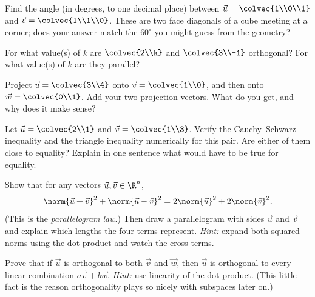 \begin{exercise}
Find the angle (in degrees, to one decimal place) between
$\vec u=\colvec{1\\0\\1}$ and $\vec v=\colvec{1\\1\\0}$. These are two face diagonals
of a cube meeting at a corner; does your answer match the $60^\circ$ you might guess
from the geometry?
\end{exercise}

\begin{exercise}
For what value(s) of $k$ are $\colvec{2\\k}$ and $\colvec{3\\-1}$ orthogonal? For
what value(s) of $k$ are they parallel?
\end{exercise}

\begin{exercise}
Project $\vec u=\colvec{3\\4}$ onto $\vec v=\colvec{1\\0}$, and then onto
$\vec w=\colvec{0\\1}$. Add your two projection vectors. What do you get, and why
does it make sense?
\end{exercise}

\begin{exercise}
Let $\vec u=\colvec{2\\1}$ and $\vec v=\colvec{1\\3}$. Verify the Cauchy--Schwarz
inequality and the triangle inequality numerically for this pair. Are either of them
close to equality? Explain in one sentence what would have to be true for equality.
\end{exercise}

\begin{exercise}
Show that for any vectors $\vec u,\vec v\in\R^n$,
\[
  \norm{\vec u+\vec v}^2 + \norm{\vec u-\vec v}^2 = 2\norm{\vec u}^2 + 2\norm{\vec v}^2.
\]
(This is the \emph{parallelogram law}.) Then draw a parallelogram with sides
$\vec u$ and $\vec v$ and explain which lengths the four terms represent.
\emph{Hint:} expand both squared norms using the dot product and watch the cross
terms.
\end{exercise}

\begin{exercise}
Prove that if $\vec u$ is orthogonal to both $\vec v$ and $\vec w$, then $\vec u$ is
orthogonal to every linear combination $a\vec v + b\vec w$. \emph{Hint:} use
linearity of the dot product. (This little fact is the reason orthogonality plays so
nicely with subspaces later on.)
\end{exercise}

